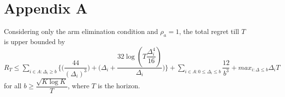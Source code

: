 



\section{Appendix A}
\begin{proposition}
Considering only the arm elimination condition and $\rho_{a}=1$, the total regret till $T$ is upper bounded by $R_{T}\leq \sum_{i\in A:\Delta_{i}\geq b}\bigg \lbrace \bigg(\dfrac{44}{(\Delta_{i})^{3}}\bigg) + \bigg(\Delta_{i}+\dfrac{32\log{(T\dfrac{\Delta_{i}^{4}}{16})}}{\Delta_{i}}\bigg)\bigg\rbrace + \sum_{i\in A:0\leq\Delta_{i}\leq b}\dfrac{12}{b^{3}} + max_{i:\Delta\leq b}\Delta_{i}T$ for all $b\geq \dfrac{\sqrt{K\log K}}{T}$, where $T$ is the horizon.
\end{proposition}

